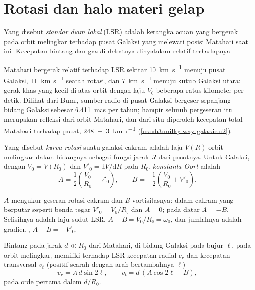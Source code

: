 \section{Rotasi dan halo materi gelap}\label{sec:b3:milky-way-galaxies:rotation}

\begin{definition}\label{def:b3:milky-way-galaxies:lsr}
Yang disebut \emph{standar diam lokal} (LSR) adalah
kerangka acuan yang bergerak pada orbit melingkar terhadap pusat Galaksi
yang melewati posisi Matahari saat ini. Kecepatan bintang dan gas di dekatnya
dinyatakan relatif terhadapnya.
\end{definition}

Matahari bergerak relatif terhadap LSR sekitar \qty{10}{km.s^{-1}} menuju
pusat Galaksi, \qty{11}{km.s^{-1}} searah rotasi, dan
\qty{7}{km.s^{-1}} menuju kutub Galaksi utara: gerak khas yang kecil
di atas orbit dengan laju $V_0$ beberapa ratus kilometer
per detik. Dilihat dari Bumi, sumber radio di pusat
Galaksi bergeser sepanjang bidang Galaksi sebesar \qty{6.411}{mas} per tahun; hampir seluruh
pergeseran itu merupakan refleksi dari orbit Matahari, dan dari situ diperoleh
kecepatan total Matahari terhadap pusat, \qty[separate-uncertainty=true]{248 \pm 3}{km.s^{-1}}
(\cref{exo:b3:milky-way-galaxies:2}).

\begin{definition}\label{def:b3:milky-way-galaxies:rotation-curve}
Yang disebut \emph{kurva rotasi} suatu galaksi cakram adalah
laju $V(R)$ orbit melingkar dalam bidangnya sebagai fungsi
jarak $R$ dari pusatnya. Untuk Galaksi, dengan $V_0 = V(R_0)$ dan
$V'_0 = \mathrm{d}V/\mathrm{d}R$ pada $R_0$, \emph{konstanta
Oort} adalah
\[
A = \frac12\left(\frac{V_0}{R_0} - V'_0\right), \qquad
B = -\frac12\left(\frac{V_0}{R_0} + V'_0\right).
\]
\end{definition}

$A$ mengukur geseran rotasi cakram dan $B$ vortisitasnya: dalam
cakram yang berputar seperti benda tegar $V'_0 = V_0/R_0$ dan $A = 0$; pada
 datar $A = -B$. Selisihnya adalah laju sudut LSR,
$A - B = V_0/R_0 = \omega_0$, dan jumlahnya adalah gradien , $A + B = -V'_0$.

\begin{theorem}\label{thm:b3:milky-way-galaxies:oort}
Bintang pada jarak $d \ll R_0$ dari Matahari, di bidang Galaksi
pada bujur $\ell$, pada orbit melingkar, memiliki terhadap LSR kecepatan radial
$v_r$ dan kecepatan transversal $v_t$ (positif searah dengan
arah bertambahnya $\ell$)
\[
v_r = A\,d\sin 2\ell, \qquad v_t = d\,(A\cos 2\ell + B),
\]
pada orde pertama dalam $d/R_0$.
\end{theorem}

